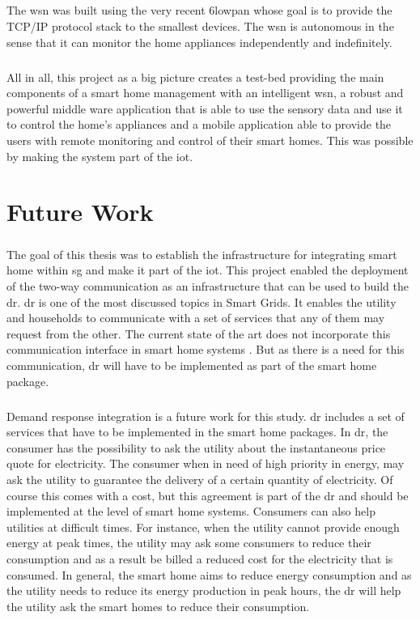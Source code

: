 \documentclass[12pt,a4paper,final]{report}
\begin{document}
\paragraph{}
The \gls{wsn} was built using the very recent \gls{6lowpan} whose goal is to provide the TCP/IP protocol stack to the smallest devices. The \gls{wsn} is autonomous in the sense that it can monitor the home appliances independently and indefinitely. 
\paragraph{}
All in all, this project as a big picture creates a test-bed providing the main components of a smart home management with an intelligent \gls{wsn}, a robust and powerful middle ware application that is able to use the sensory data and use it to control the home's appliances and a mobile application able to provide the users with remote monitoring and control of their smart homes. This was possible by making the system part of the \gls{iot}.
\chapter{Future Work}
\paragraph{}
The goal of this thesis was to establish the infrastructure for integrating smart home within \gls{sg} and make it part of the \gls{iot}. This project enabled the deployment of the two-way communication as an infrastructure that can be used to build the \gls{dr}. \gls{dr} is one of the most discussed topics in Smart Grids. It enables the utility and households to communicate with a set of services that any of them may request from the other. The current state of the art does not incorporate this communication interface in smart home systems \cite{ref15}. But as there is a need for this communication, \gls{dr} will have to be implemented as part of the smart home package.
\paragraph{}
Demand response integration is a future work for this study. \gls{dr} includes a set of services that have to be implemented in the smart home packages. In \gls{dr}, the consumer has the possibility to ask the utility about the instantaneous price quote for electricity. The consumer when in need of high priority in energy, may ask the utility to guarantee the delivery of a certain quantity of electricity. Of course this comes with a cost, but this agreement is part of the \gls{dr} and should be implemented at the level of smart home systems. Consumers can also help utilities at difficult times. For instance, when the utility cannot provide enough energy at peak times, the utility may ask some consumers to reduce their consumption and as a result be billed a reduced cost for the electricity that is consumed. In general, the smart home aims to reduce energy consumption and as the utility needs to reduce its energy production in peak hours, the \gls{dr} will help the utility ask the smart homes to reduce their consumption.
\end{document}
